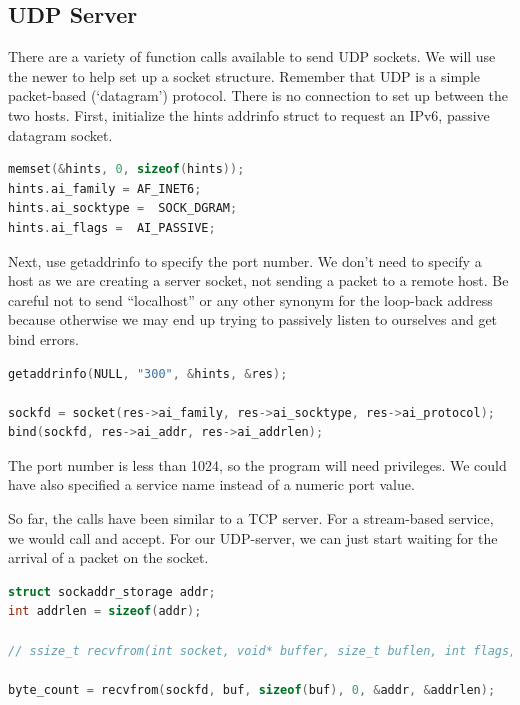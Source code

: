 \subsection{UDP Server}

There are a variety of function calls available to send UDP sockets.
We will use the newer  to help set up a socket structure.
Remember that UDP is a simple packet-based (`datagram') protocol. There is no connection to set up between the two hosts.
First, initialize the hints addrinfo struct to request an IPv6, passive datagram socket.

\begin{lstlisting}[language=C]
memset(&hints, 0, sizeof(hints));
hints.ai_family = AF_INET6;
hints.ai_socktype =  SOCK_DGRAM;
hints.ai_flags =  AI_PASSIVE;
\end{lstlisting}

Next, use getaddrinfo to specify the port number.
We don't need to specify a host as we are creating a server socket, not sending a packet to a remote host.
Be careful not to send ``localhost'' or any other synonym for the loop-back address because otherwise we may end up trying to passively listen to ourselves and get bind errors.

\begin{lstlisting}[language=C]
getaddrinfo(NULL, "300", &hints, &res);

sockfd = socket(res->ai_family, res->ai_socktype, res->ai_protocol);
bind(sockfd, res->ai_addr, res->ai_addrlen);
\end{lstlisting}

The port number is less than 1024, so the program will need  privileges.
We could have also specified a service name instead of a numeric port value.

So far, the calls have been similar to a TCP server.
For a stream-based service, we would call  and accept.
For our UDP-server, we can just start waiting for the arrival of a packet on the socket.

\begin{lstlisting}[language=C]
struct sockaddr_storage addr;
int addrlen = sizeof(addr);

// ssize_t recvfrom(int socket, void* buffer, size_t buflen, int flags, struct sockaddr *addr, socklen_t * address_len);

byte_count = recvfrom(sockfd, buf, sizeof(buf), 0, &addr, &addrlen);
\end{lstlisting}

